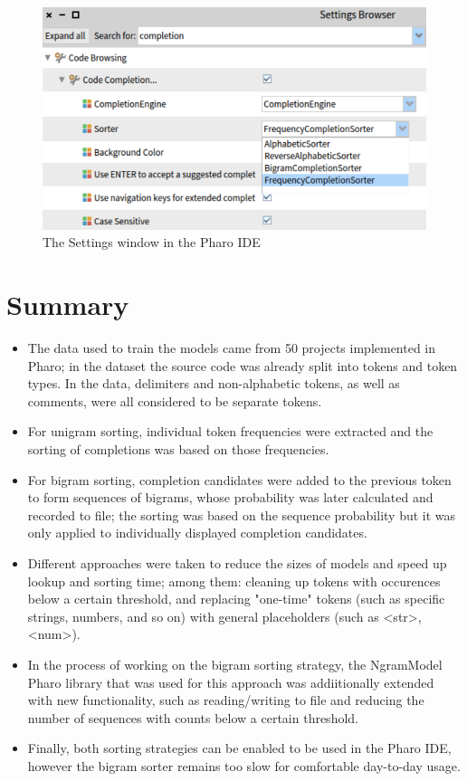 \begin{figure}[H]
    \centering
    \includegraphics[width=0.9\linewidth]{images/settings.png}
    \caption{The Settings window in the Pharo IDE}
    \label{fig:settings}
\end{figure}

\section{Summary}
\label{sec:ProposedSolution-Summary}
\begin{itemize}
    \item The data used to train the models came from 50 projects implemented in Pharo; in the dataset the source code was already split into tokens and token types. In the data, delimiters and non-alphabetic tokens, as well as comments, were all considered to be separate tokens.
    \item For unigram sorting, individual token frequencies were extracted and the sorting of completions was based on those frequencies.
    \item For bigram sorting, completion candidates were added to the previous token to form sequences of bigrams, whose probability was later calculated and recorded to file; the sorting was based on the sequence probability but it was only applied to individually displayed completion candidates.
    \item Different approaches were taken to reduce the sizes of models and speed up lookup and sorting time; among them: cleaning up tokens with occurences below a certain threshold, and replacing "one-time" tokens (such as specific strings, numbers, and so on) with general placeholders (such as <str>, <num>).
    \item In the process of working on the bigram sorting strategy, the NgramModel Pharo library that was used for this approach was addiitionally extended with new functionality, such as reading/writing to file and reducing the number of sequences with counts below a certain threshold.
    \item Finally, both sorting strategies can be enabled to be used in the Pharo IDE, however the bigram sorter remains too slow for comfortable day-to-day usage.
\end{itemize}